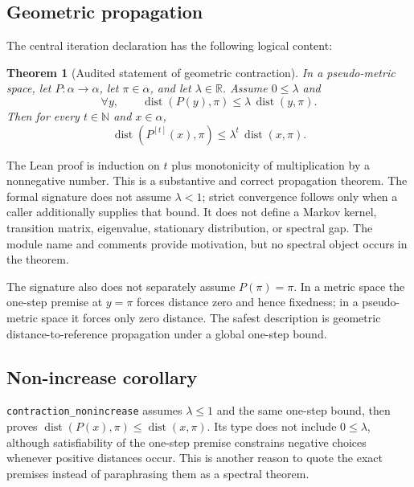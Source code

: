 \documentclass[10pt,letterpaper]{article}
\newtheorem{theorem}{Theorem}[section]
\theoremstyle{definition}
\newcommand{\decl}[1]{\nolinkurl{#1}}
\begin{document}
\subsection{Geometric propagation}
The central iteration declaration has the following logical content:
\begin{theorem}[Audited statement of geometric contraction]\label{thm:geom}
In a pseudo-metric space, let \(P:\alpha\to\alpha\), let \(\pi\in\alpha\), and
let \(\lambda\in\mathbb{R}\). Assume \(0\leq\lambda\) and
\[
\forall y,\qquad
\operatorname{dist}(P(y),\pi)
\leq \lambda\,\operatorname{dist}(y,\pi).
\]
Then for every \(t\in\mathbb{N}\) and \(x\in\alpha\),
\[
\operatorname{dist}(P^{[t]}(x),\pi)
\leq \lambda^t\,\operatorname{dist}(x,\pi).
\]
\end{theorem}
The Lean proof is induction on \(t\) plus monotonicity of multiplication by a
nonnegative number. This is a substantive and correct propagation theorem. The
formal signature does not assume \(\lambda<1\); strict convergence follows only
when a caller additionally supplies that bound. It does not define a Markov
kernel, transition matrix, eigenvalue, stationary distribution, or spectral
gap. The module name and comments provide motivation, but no spectral object
occurs in the theorem.

The signature also does not separately assume \(P(\pi)=\pi\). In a metric space
the one-step premise at \(y=\pi\) forces distance zero and hence fixedness; in a
pseudo-metric space it forces only zero distance. The safest description is
geometric distance-to-reference propagation under a global one-step bound.

\subsection{Non-increase corollary}
\decl{contraction_nonincrease} assumes \(\lambda\leq 1\) and the same one-step
bound, then proves
\(\operatorname{dist}(P(x),\pi)\leq\operatorname{dist}(x,\pi)\).
Its type does not include \(0\leq\lambda\), although satisfiability of the
one-step premise constrains negative choices whenever positive distances
occur. This is another reason to quote the exact premises instead of
paraphrasing them as a spectral theorem.
\end{document}
